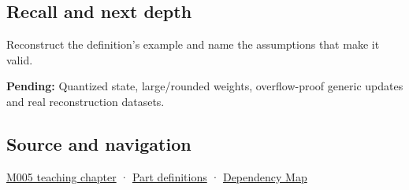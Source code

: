 \subsection{Recall and next depth}\label{appendix-260182e617b7-recall-and-next-depth}

Reconstruct the definition's example and name the assumptions that make it valid.

\textbf{Pending:} Quantized state, large/rounded weights, overflow-proof generic updates and real reconstruction datasets.

\subsection{Source and navigation}\label{appendix-260182e617b7-source-and-navigation}

\hyperref[01-foundations-i-ch001-when-arithmetic-meets-uncertainty]{M005 teaching chapter} · \hyperref[appendix-fd090d982a15-m005---parts-77-88]{Part definitions} · \hyperref[appendix-4ad47bdd269a]{Dependency Map}
